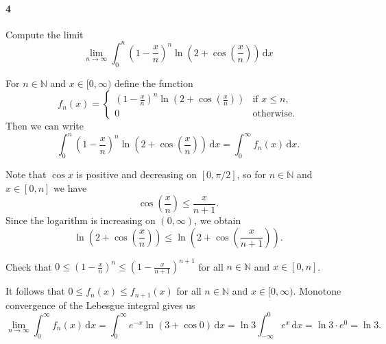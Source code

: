 \documentclass[12pt]{article}
\newlength{\myparskip}
\newenvironment{fullbox}{\begin{lrbox}{\savefullbox}\begin{minipage}{\dimexpr\textwidth-2\fboxsep\relax}\setlength{\parskip}{\myparskip}}{\end{minipage}\end{lrbox}\framebox[\textwidth]{\usebox{\savefullbox}}}
\newenvironment{pbox}[1][]{\begin{fullbox}\ifx#1\empty\else\paragraph{#1}\phantom{}\fi}{\end{fullbox}}
\theoremstyle{definition}
\newcommand{\N}{\mathbb{N}}
\newcommand{\<}{\langle}
\renewcommand{\>}{\rangle}
\newcommand{\dd}{\,\mathrm{d}}
\newcommand{\qty}[1]{\left(#1\right)}
\newcommand{\pfrac}[2]{\qty{\frac{#1}{#2}}}
\begin{document}
\newpage
\begin{pbox}[4]
    Compute the limit
    \[
        \lim_{n \to \infty} \int_{0}^{n} \qty{1 - \frac{x}{n}}^n \ln\qty{2 + \cos\pfrac{x}{n}} \dd{x} 
    \]
\end{pbox}

For $n \in \N$ and $x \in [0, \infty)$ define the function
\[
    f_n(x) = \begin{cases}
        \qty{1 - \frac{x}{n}}^n \ln\qty{2 + \cos\pfrac{x}{n}} &\text{if } x \leq n, \\
        0 &\text{otherwise}.
    \end{cases}
\]
Then we can write
\[
    \int_{0}^{n} \qty{1 - \frac{x}{n}}^n \ln\qty{2 + \cos\pfrac{x}{n}} \dd{x} 
        = \int_{0}^{\infty} f_n(x) \dd{x}.
\]

Note that $\cos x$ is positive and decreasing on $[0, \pi/2]$, so for $n \in \N$ and $x \in [0, n]$ we have
\[
    \cos\pfrac{x}{n} \leq \frac{x}{n + 1}.
\]
Since the logarithm is increasing on $(0, \infty)$, we obtain
\[
    \ln\qty{2 + \cos\pfrac{x}{n}} \leq \ln\qty{2 + \cos\pfrac{x}{n+1}}.
\]

Check that $0 \leq (1 - \frac{x}{n})^n \leq (1 - \frac{x}{n+1})^{n+1}$ for all $n \in \N$ and $x \in [0, n]$.

It follows that $0 \leq f_n(x) \leq f_{n+1}(x)$ for all $n \in \N$ and $x \in [0, \infty)$.
Monotone convergence of the Lebesgue integral gives us
\[
    \lim_{n \to \infty} \int_{0}^{\infty} f_n(x) \dd{x}
        = \int_{0}^{\infty} e^{-x} \ln(3 + \cos 0) \dd{x}
        = \ln 3 \int_{-\infty}^{0} e^x \dd{x}
        = \ln 3 \cdot e^0
        = \ln 3.
\] 
\end{document}
